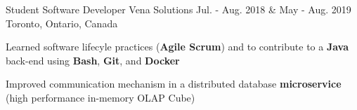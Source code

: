 \begin{cventries}
  \cventry
    {Student Software Developer} %
    {Vena Solutions} %
    {Jul. - Aug. 2018 \& May - Aug. 2019} %
    {Toronto, Ontario, Canada} %
    {
      \begin{cvitems} %
        \item{Learned software lifecyle practices (\textbf{Agile Scrum}) and to contribute to a \textbf{Java} back-end using \textbf{Bash}, \textbf{Git}, and \textbf{Docker}}
        \item{Improved communication mechanism in a distributed database \textbf{microservice} (high performance in-memory OLAP Cube)}
      \end{cvitems}
    }



\end{cventries}
